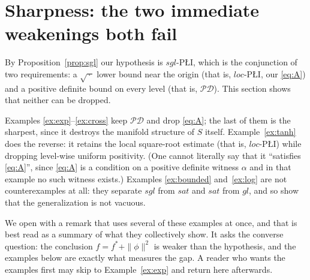 \documentclass[11pt]{article}
\theoremstyle{plain}
\theoremstyle{definition}
\theoremstyle{remark}
\begin{document}
\section{Sharpness: the two immediate weakenings both fail}
\label{sec:examples}

By Proposition~\ref{prop:sgl} our hypothesis is $sgl$-P\L{}I, which is the
conjunction of two requirements: a $\sqrt{\,\cdot\,}$ lower bound near the origin
(that is, $loc$-P\L{}I, our \eqref{eq:A}) and a positive definite bound on every
level (that is, $\mathcal{PD}$). This section shows that neither can be dropped.

Examples \ref{ex:exp}--\ref{ex:cross} keep $\mathcal{PD}$ and drop
\eqref{eq:A}; the last of them is the sharpest, since it destroys the manifold
structure of $S$ itself. Example~\ref{ex:tanh} does the reverse: it retains the
local square-root estimate (that is, $loc$-P\L{}I) while dropping level-wise
uniform positivity. (One cannot literally say that it ``satisfies \eqref{eq:A}'',
since \eqref{eq:A} is a condition on a positive definite witness $\alpha$ and in
that example no such witness exists.) Examples \ref{ex:bounded}
and~\ref{ex:log} are not counterexamples at all: they separate $sgl$ from $sat$
and $sat$ from $gl$, and so show that the generalization is not vacuous.

We open with a remark that uses several of these examples at once, and that is
best read as a summary of what they collectively show. It asks the converse
question: the conclusion $f = f^*+\|\phi\|^2$ is weaker than the hypothesis, and
the examples below are exactly what measures the gap. A reader who wants the
examples first may skip to Example~\ref{ex:exp} and return here afterwards.
\end{document}
